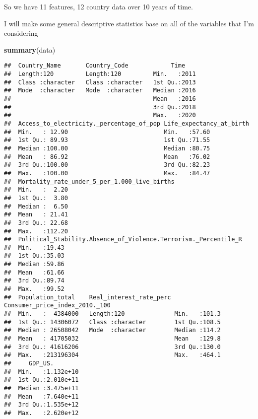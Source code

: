 \documentclass[
]{article}
\newenvironment{Shaded}{\begin{snugshade}}{\end{snugshade}}
\newcommand{\FunctionTok}[1]{\textcolor[rgb]{0.13,0.29,0.53}{\textbf{#1}}}
\newcommand{\NormalTok}[1]{#1}
\begin{document}
So we have 11 features, 12 country data over 10 years of time.

I will make some general descriptive statistics base on all of the
variables that I'm considering

\begin{Shaded}
\begin{Highlighting}[]
\FunctionTok{summary}\NormalTok{(data)}
\end{Highlighting}
\end{Shaded}

\begin{verbatim}
##  Country_Name       Country_Code            Time     
##  Length:120         Length:120         Min.   :2011  
##  Class :character   Class :character   1st Qu.:2013  
##  Mode  :character   Mode  :character   Median :2016  
##                                        Mean   :2016  
##                                        3rd Qu.:2018  
##                                        Max.   :2020  
##  Access_to_electricity._percentage_of_pop Life_expectancy_at_birth
##  Min.   : 12.90                           Min.   :57.60           
##  1st Qu.: 89.93                           1st Qu.:71.55           
##  Median :100.00                           Median :80.75           
##  Mean   : 86.92                           Mean   :76.02           
##  3rd Qu.:100.00                           3rd Qu.:82.23           
##  Max.   :100.00                           Max.   :84.47           
##  Mortality_rate_under_5_per_1.000_live_births
##  Min.   :  2.20                              
##  1st Qu.:  3.80                              
##  Median :  6.50                              
##  Mean   : 21.41                              
##  3rd Qu.: 22.68                              
##  Max.   :112.20                              
##  Political_Stability.Absence_of_Violence.Terrorism._Percentile_R
##  Min.   :19.43                                                  
##  1st Qu.:35.03                                                  
##  Median :59.86                                                  
##  Mean   :61.66                                                  
##  3rd Qu.:89.74                                                  
##  Max.   :99.52                                                  
##  Population_total    Real_interest_rate_perc Consumer_price_index_2010._100
##  Min.   :  4384000   Length:120              Min.   :101.3                 
##  1st Qu.: 14306072   Class :character        1st Qu.:108.5                 
##  Median : 26508042   Mode  :character        Median :114.2                 
##  Mean   : 41705032                           Mean   :129.8                 
##  3rd Qu.: 41616206                           3rd Qu.:130.0                 
##  Max.   :213196304                           Max.   :464.1                 
##     GDP_US.         
##  Min.   :1.132e+10  
##  1st Qu.:2.010e+11  
##  Median :3.475e+11  
##  Mean   :7.640e+11  
##  3rd Qu.:1.535e+12  
##  Max.   :2.620e+12
\end{verbatim}
\end{document}
